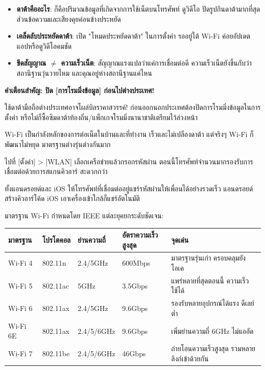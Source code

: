
\begin{itemize}
  \item \textbf{ดาต้าคืออะไร}: ก็คือปริมาณข้อมูลที่เกิดจากการใช้เน็ตบนโทรศัพท์ ดูวิดีโอ ปัดรูปกินดาต้ามากที่สุด ส่วนข้อความและเสียงคุยค่อนข้างประหยัด
  \item \textbf{เคล็ดลับประหยัดดาต้า}: เปิด "โหมดประหยัดดาต้า" ในการตั้งค่า รออยู่ใต้ Wi-Fi ค่อยอัปเดตแอปหรือดูวิดีโอคมชัด
  \item \textbf{ขีดสัญญาณ $\neq$ ความเร็วเน็ต}: สัญญาณแรงแปลว่าแค่การเชื่อมต่อดี ความเร็วเน็ตยังขึ้นกับว่าสถานีฐานวุ่นวายไหม และคุณอยู่ห่างสถานีฐานแค่ไหน
\end{itemize}

\textbf{คำเตือนสำคัญ: ปิด [การโรมมิ่งข้อมูล] ก่อนไปต่างประเทศ!}\par

ใช้ดาต้ามือถือต่างประเทศอาจโผล่บิลราคาสวรรค์! ก่อนออกนอกประเทศต้องปิดการโรมมิ่งข้อมูลในการตั้งค่า หรือไม่ก็ซื้อซิมดาต้าท้องถิ่น/แพ็กเกจโรมมิ่งนานาชาติเตรียมไว้ล่วงหน้า


Wi-Fi เป็นกำลังหลักของการต่อเน็ตในบ้านและที่ทำงาน เร็วและไม่เปลืองดาต้า แต่จริงๆ Wi-Fi ก็พัฒนาไม่หยุด มาตรฐานต่างรุ่นต่างกันมาก


ไปที่ [ตั้งค่า] > [WLAN] เลือกเครือข่ายแล้วกรอกรหัสผ่าน ตอนนี้โทรศัพท์จำนวนมากรองรับการเชื่อมต่อด้วยการสแกนคิวอาร์ สะดวกกว่า


ทั้งแอนดรอยด์และ iOS ให้โทรศัพท์ที่เชื่อมต่ออยู่แชร์รหัสผ่านให้เพื่อนได้อย่างรวดเร็ว แอนดรอยด์สร้างคิวอาร์โค้ด iOS เอาเครื่องเข้าใกล้ก็แชร์อัตโนมัติ


มาตรฐาน Wi-Fi กำหนดโดย IEEE แต่ละยุคยกระดับชัดเจน:

\begin{center}
\begin{tabularx}{\linewidth}{|X|X|X|X|X|}
\hline
\textbf{มาตรฐาน} & \textbf{โปรโตคอล} & \textbf{ย่านความถี่} & \textbf{อัตราความเร็วสูงสุด} & \textbf{จุดเด่น} \tabularnewline
\hline
Wi-Fi 4 & 802.11n & 2.4/5GHz & 600Mbps & มาตรฐานรุ่นเก่า ครอบคลุมยังโอเค \tabularnewline
Wi-Fi 5 & 802.11ac & 5GHz & 3.5Gbps & แพร่หลายที่สุดตอนนี้ ความเร็วใช้ได้ \tabularnewline
Wi-Fi 6 & 802.11ax & 2.4/5GHz & 9.6Gbps & รองรับหลายอุปกรณ์ได้แรง ดีเลย์ต่ำ \tabularnewline
Wi-Fi 6E & 802.11ax & 2.4/5/6GHz & 9.6Gbps & เพิ่มย่านความถี่ 6GHz ไม่แออัด \tabularnewline
Wi-Fi 7 & 802.11be & 2.4/5/6GHz & 46Gbps & ถ่ายโอนความเร็วสูงสุด รวมหลายลิงก์เข้าด้วยกัน \tabularnewline
\hline
\end{tabularx}
\end{center}

